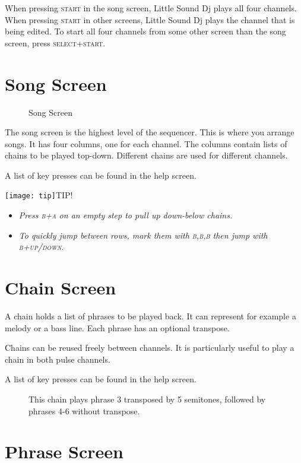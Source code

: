 When pressing \textsc{start} in the song screen, Little Sound Dj plays all four
channels. When pressing \textsc{start} in other screens, Little Sound Dj plays the
channel that is being edited.
To start all four channels from some other screen than the song screen,
press \textsc{select+start}.

\section{Song Screen}

\begin{figure}[hbtp]
\centering
{}
\caption{Song Screen}
\end{figure}

The song screen is the highest level of the sequencer. This is where you arrange songs.
It has four columns, one for each channel. The columns contain lists of chains to be played top-down. Different chains are used for different channels.

A list of key presses can be found in the help screen.

\texttt{[image: tip]}TIP!
\begin{itemize}
	\item \textit{Press \textsc{b+a} on an empty step to pull up down-below chains.}
	\item \textit{To quickly jump between rows, mark them with \textsc{b,b,b} then jump with \textsc{b+up/down}.}
\end{itemize}

\section{Chain Screen}
A chain holds a list of phrases to be played back. It can represent for example a melody or a bass line. Each phrase has an optional transpose.

Chains can be reused freely between channels. It is particularly useful to play a chain in both pulse channels.

A list of key presses can be found in the help screen.

\begin{figure}[hbtp]
\centering
{}
	\caption{This chain plays phrase 3 transposed by 5 semitones, followed by phrases 4-6 without transpose.}
\end{figure}

\section{Phrase Screen}

